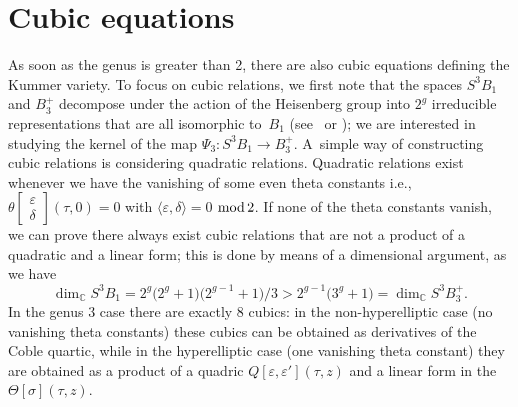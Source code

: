 \documentclass[pdftex]{sigma}
\numberwithin{equation}{section}
\newcommand{\de}{\delta}
\newcommand{\ep}{\varepsilon}
\newcommand{\CC}{{\mathbb{C}}}
\def\s{\sigma}
\def\T{\Theta}
\begin{document}
\section{Cubic equations}

As soon as the genus is greater than 2, there are also cubic equations defining the Kummer va\-riety. To focus on cubic relations, we first note that the spaces $S^3 B_1$ and $B_3^+$ decompose under the action of the Heisenberg group into $2^g$ irreducible representations that are all isomorphic to~$B_1$ (see~\cite{vG} or \cite{Bea}); we are interested in studying the kernel of the map $ \Psi_3\colon S^3B_1\to B_3^+$. A~simple way of constructing cubic relations is considering quadratic relations. Quadratic relations exist whenever we have the vanishing of some even theta constants i.e., $ \theta\left[\begin{smallmatrix}\ep \\ \de\end{smallmatrix}\right] (\tau,0)=0$ with $\langle \ep , \de\rangle =0$ ${\rm mod}\, 2$. If none of the theta constants vanish, we can prove there always exist cubic relations that are not a product of a quadratic and a linear form; this is done by means of a dimensional argument, as we have
\[
 \dim_{\CC} S^3 B_1=2^g\big(2^g+1\big)\big(2^{g-1}+1\big)/3> 2^{g-1}\big( 3^g+1\big)=\dim_{\CC} S^3 B_3^+.
\]
 In the genus 3 case there are exactly 8 cubics: in the non-hyperelliptic case (no vanishing theta constants) these cubics can be obtained as derivatives of the Coble quartic, while in the hyperelliptic case (one vanishing theta constant) they are obtained as a product of a quadric $Q[\ep, \ep'](\tau, z)$ and a linear form in the $\T[\s](\tau,z)$.
\end{document}
